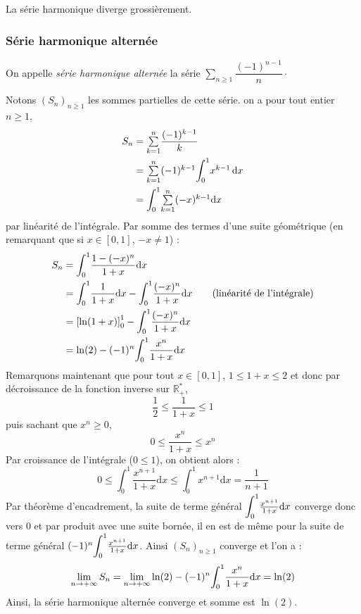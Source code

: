 \documentclass[french,11pt,twoside]{VcCours}
\newcommand{\dx}{\text{d}x}
\newcommand{\Sum}[2]{\ensuremath{\textstyle{\sum\limits_{#1}^{#2}}}}
\newcommand{\Int}[2]{\ensuremath{\mathchoice%
	{{\displaystyle\int_{#1}^{#2}}}
	{{\displaystyle\int_{#1}^{#2}}}
	{\int_{#1}^{#2}}
	{\int_{#1}^{#2}}
}}
\begin{document}
\begin{Remarque}{} La série harmonique diverge grossièrement.
\end{Remarque}

\subsubsection{Série harmonique alternée}

On appelle \emph{série harmonique alternée} la série $ \Sum{n \geq 1}{} \dfrac{(-1)^{n-1}}{n} \cdot$

\medskip

Notons $(S_n)_{n \geq 1}$ les sommes partielles de cette série.
on a pour tout entier $n \geq 1$,
\begin{align*}
S_n & = \Sum{k=1}{n} \dfrac{(-1)^{k-1}}{k} \\
& = \Sum{k=1}{n} (-1)^{k-1} \Int{0}{1} x^{k-1}  \, \dx\\
& =   \Int{0}{1} \Sum{k=1}{n} (-x)^{k-1} \dx \\
\end{align*}
par linéarité de l'intégrale. Par somme des termes d'une suite géométrique (en remarquant que si $x \in [0,1]$, $-x \neq 1$) :
\begin{align*}
S_n & = \Int{0}{1} \frac{1-(-x)^{n}}{1+x} \dx \\
& = \Int{0}{1} \frac{1}{1+x} \dx - \Int{0}{1} \frac{(-x)^{n}}{1+x} \dx \qquad \hbox{(linéarité de l'intégrale)}\\
& = \left[ \ln(1+x) \right]_0^1 - \Int{0}{1} \frac{(-x)^{n}}{1+x} \dx \\
& = \ln(2) - (-1)^n\Int{0}{1} \frac{x^{n}}{1+x} \dx \\
\end{align*}
Remarquons maintenant que pour tout $x \in [0,1]$, $1 \leq 1+x \leq 2$ et donc par décroissance de la fonction inverse sur $\mathbb{R}_+^{*}$,
$$ \frac{1}{2} \leq \frac{1}{1+x} \leq 1$$
puis sachant que $x^n \geq 0$,
$$ 0 \leq  \frac{x^n}{1+x} \leq x^n$$
Par croissance de l'intégrale ($0 \leq 1$), on obtient alors :
$$ 0 \leq \int_{0}^{1} \frac{x^{n+1}}{1+x} \dx \leq \int_{0}^{1} x^{n+1} \dx = \frac{1}{n+1}$$
Par théorème d'encadrement, la suite de terme général $\Int{0}{1} \frac{x^{n+1}}{1+x} \dx$ converge donc vers $0$ et par produit avec une suite bornée, il en est de même pour la suite de terme général $(-1)^n\Int{0}{1} \frac{x^{n+1}}{1+x} \dx$. Ainsi $(S_n)_{n \geq 1}$ converge et l'on a :
$$ \lim_{n \rightarrow + \infty} S_n = \lim_{n \rightarrow + \infty} \ln(2) - (-1)^n \Int{0}{1} \frac{x^{n}}{1+x} \dx = \ln(2)$$
Ainsi, la série harmonique alternée converge et somme est $\ln(2)$.
\end{document}
